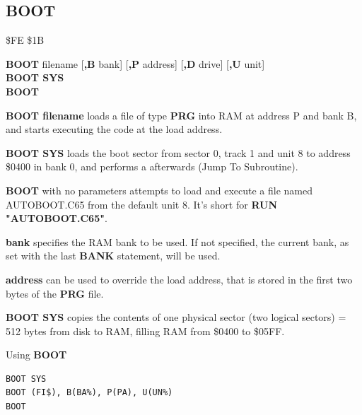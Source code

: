 
\newpage
\subsection{BOOT}
\begin{description}[leftmargin=2cm,style=nextline]
\item [Token:] \$FE \$1B
\item [Format:] {\bf BOOT} filename [{\bf,B} bank]
                [{\bf,P} address]  [{\bf,D} drive] [{\bf,U} unit]\\
                {\bf BOOT SYS} \\
                {\bf BOOT}
\item [Usage:]
   {\bf BOOT filename} loads a file of type
   {\bf PRG} into RAM at address P and bank B, and starts executing
   the code at the load address.

   {\bf BOOT SYS} loads the boot sector from sector 0,
   track 1 and unit 8 to address \$0400 in bank 0, and
   performs a  afterwards (Jump To Subroutine).

   {\bf BOOT} with no parameters attempts to load
   and execute a file named AUTOBOOT.C65 from the default unit 8.
   It's short for {\bf RUN "AUTOBOOT.C65"}.

   \filenamedefinition

   {\bf bank} specifies the RAM bank to be used.
   If not specified, the current bank, as set with the last
   {\bf BANK} statement, will be used.

   {\bf address} can be used to override the load address,
   that is stored in the first two bytes of the {\bf PRG} file.

   \drivedefinition

   \unitdefinition

\item [Remarks:]
   {\bf BOOT SYS} copies the contents of one physical sector
   (two logical sectors) = 512 bytes from disk to RAM,
   filling RAM from \$0400 to \$05FF.

\item [Examples:] Using {\bf BOOT}
\begin{tcolorbox}[colback=black,coltext=white]
\verbatimfont{\codefont}
\begin{verbatim}
BOOT SYS
BOOT (FI$), B(BA%), P(PA), U(UN%)
BOOT
\end{verbatim}
\end{tcolorbox}
\end{description}

